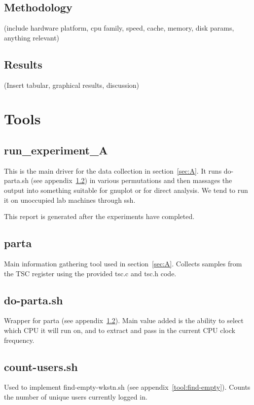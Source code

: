 \documentclass{article}
\begin{document}
\subsection{Methodology}
(include hardware platform, cpu family, speed, cache, memory, disk params, anything relevant)
\subsection{Results}
(Insert tabular, graphical results, discussion)

\newpage
\appendix
\section{Tools}

\subsection{run\_experiment\_A} \label{tool:run}
This is the main driver for the data collection in section~\ref{sec:A}.
It runs do-parta.sh (see appendix~\ref{tool:parta}) in various permutations
and then massages the output into something suitable for gnuplot or for direct
analysis. We tend to run it on unoccupied lab machines through ssh.

This report is generated after the experiments have completed.


\subsection{parta} \label{tool:parta}
Main information gathering tool used in section~\ref{sec:A}. Collects samples
from the TSC register using the provided tsc.c and tsc.h code.

\subsection{do-parta.sh} \label{tool:do-parta}
Wrapper for parta (see appendix~\ref{tool:parta}). Main value added is the
ability to select which CPU it will run on, and to extract and pass in the
current CPU clock frequency.

\subsection{count-users.sh} \label{tool:count-users.sh}
Used to implement find-empty-wkstn.sh (see appendix~\ref{tool:find-empty}).
Counts the number of unique users currently logged in.
\end{document}
